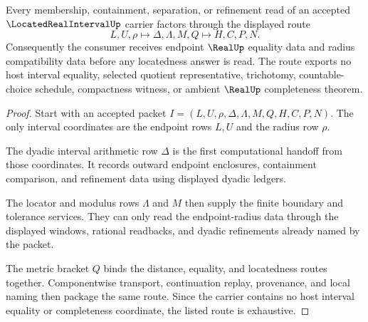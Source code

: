 \begin{theorem}
\label{thm:located-real-interval-exactness-route}
Every membership, containment, separation, or refinement read of an accepted $\LocatedRealIntervalUp$ carrier factors through the displayed route
$$
L,U,\rho \longmapsto \Delta,\Lambda,M,Q \longmapsto H,C,P,N .
$$
Consequently the consumer receives endpoint $\RealUp$ equality data and radius compatibility data before any locatedness answer is read. The route exports no host interval equality, selected quotient representative, trichotomy, countable-choice schedule, compactness witness, or ambient $\RealUp$ completeness theorem.
\end{theorem}
\begin{proof}
Start with an accepted packet $I=(L,U,\rho,\Delta,\Lambda,M,Q,H,C,P,N)$. The only interval coordinates are the endpoint rows $L,U$ and the radius row $\rho$.

The dyadic interval arithmetic row $\Delta$ is the first computational handoff from those coordinates. It records outward endpoint enclosures, containment comparison, and refinement data using displayed dyadic ledgers.

The locator and modulus rows $\Lambda$ and $M$ then supply the finite boundary and tolerance services. They can only read the endpoint-radius data through the displayed windows, rational readbacks, and dyadic refinements already named by the packet.

The metric bracket $Q$ binds the distance, equality, and locatedness routes together. Componentwise transport, continuation replay, provenance, and local naming then package the same route. Since the carrier contains no host interval equality or completeness coordinate, the listed route is exhaustive.
\end{proof}


